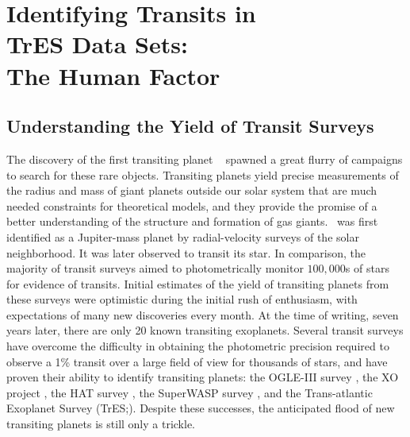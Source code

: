 \chapter[Identifying Transits in TrES Data Sets: The Human Factor]%
{%
Identifying Transits in \\ TrES Data Sets: \\ The Human Factor%
\protect\CFNF%
}\label{cha:human}

\section{Understanding the Yield of Transit Surveys}\label{cha:human:sec:intro}

The discovery of the first transiting planet \hdTZNb\ \citep{Charbonneau_Brown_Latham:apjl:2000a, Henry_Marcy_Butler:apj:2000a} spawned a great flurry of campaigns to search for these rare objects.
Transiting planets yield precise measurements of the radius and mass of giant planets outside our solar system that are much needed constraints for theoretical models, and they provide the promise of a better understanding of the structure and formation of gas giants.
\hdTZNb\ was first identified \citep{Mazeh_Naef_Torres:apj:2000a} as a Jupiter-mass planet by radial-velocity surveys of the solar neighborhood.
It was later observed to transit its star.
In comparison, the majority of transit surveys aimed to photometrically monitor $100,\!000$s of stars for evidence of transits.
Initial estimates \citep[see, e.g.,][]{Horne:ASP:2003a} of the yield of transiting planets from these surveys were optimistic during the initial rush of enthusiasm, with expectations of many new discoveries every month.
At the time of writing, seven years later, there are only 20 known transiting exoplanets.
Several transit surveys have overcome the difficulty in obtaining the photometric precision required to observe a 1\% transit over a large field of view for thousands of stars, and have proven their ability to identify transiting planets: the OGLE-III survey \citep{Udalski_Paczynski_Zebrun:acta:2002a}, the XO project \citep{McCullough_Stys_Valenti:pasp:2005a}, the HAT survey \citep{Bakos_Lazar_Papp:pasp:2002a}, the SuperWASP survey \citep{Street_Pollaco_Fitzsimmons:ASP:2003a}, and the Trans-atlantic Exoplanet Survey (TrES;\@\citealt{Alonso_Deeg_Brown:an:2004a, Dunham_Mandushev_Taylor:pasp:2004a, ODonovan_Charbonneau_Kotredes:AIP:2004a}).
Despite these successes, the anticipated flood of new transiting planets is still only a trickle.

